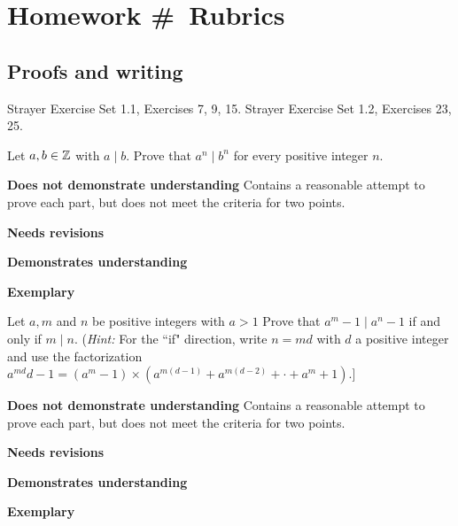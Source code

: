 \documentclass[letterpaper, 11pt]{ximera}
\begin{document}
\chapter{Homework \#\homework\ Rubrics}

\section*{Proofs and writing}  %
Strayer Exercise Set 1.1, Exercises 7, 9, 15. Strayer Exercise Set 1.2, Exercises 23, 25. 
\begin{ex}
 Let $a, b \in\mathbb Z$ with $a\mid b$. Prove that $a^n\mid b^n$ for every positive integer $n$.
\end{ex}

\begin{writeRubric}
    \item \textbf{Does not demonstrate understanding}
     Contains a reasonable attempt to prove each part, but does not meet the criteria for two points.
    \item \textbf{Needs revisions}
     
    \item \textbf{Demonstrates understanding}
    
    \item \textbf{Exemplary}
        
\end{writeRubric}


\begin{ex}
 Let $a, m$ and $n$ be positive integers with $a >1$ Prove that $a^m-1\mid a^n-1$ if and only if $m\mid n.$ (\emph{Hint:} For the ``if" direction, write $n= md$ with $d$ a positive integer and use the factorization $a^{md} d - 1= (a^m - 1) \times  (a^{m(d-1)} + a^{m(d-2)} +\cdot + a^m + 1).$]
\end{ex}

\begin{writeRubric}
    \item \textbf{Does not demonstrate understanding}
     Contains a reasonable attempt to prove each part, but does not meet the criteria for two points.
    \item \textbf{Needs revisions}
     
    \item \textbf{Demonstrates understanding}
    
    \item \textbf{Exemplary}
        
\end{writeRubric}
\end{document}
